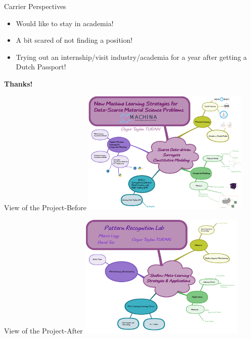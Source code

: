 \documentclass[aspectratio=169]{beamer}
\newcommand{\thx}{\color{Pink}\huge{\textbf{Thanks!}}}
\begin{document}
\begin{frame}{Carrier Perspectives}
  \begin{itemize}
    \item Would like to stay in academia!
    \item A bit scared of not finding a position!
    \item Trying out an internship/visit industry/academia for a year after getting a Dutch Passport!
  \end{itemize}
\end{frame}

\begin{frame}
  \centering
  \thx
\end{frame}



\begin{frame}{View of the Project-Before}
  \centering
  \includegraphics[width=0.6\textwidth]{figures/mindmap.pdf}
\end{frame}

\begin{frame}{View of the Project-After}
  \centering
  \includegraphics[width=0.6\textwidth]{figures/mindmap_new.pdf}
\end{frame}
\end{document}
